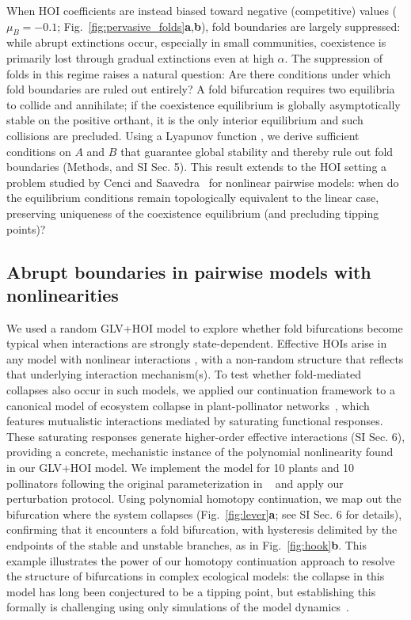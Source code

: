 \documentclass[
 reprint,
 amsmath,
 amssymb,
 aps,
 superscriptaddress,
]{revtex4-2}
\begin{document}
When HOI coefficients are instead biased toward negative (competitive) values ($\mu_B = -0.1$; Fig.~\ref{fig:pervasive_folds}\textbf{a},\textbf{b}), fold boundaries are largely suppressed: while abrupt extinctions occur, especially in small communities, coexistence is primarily lost through gradual extinctions even at high $\alpha$. The suppression of folds in this regime raises a natural question: Are there conditions under which fold boundaries are ruled out entirely? A fold bifurcation requires two equilibria to collide and annihilate; if the coexistence equilibrium is globally asymptotically stable on the positive orthant, it is the only interior equilibrium and such collisions are precluded. Using a Lyapunov function \cite{goh_global_1977, allesina_global_2026}, we derive sufficient conditions on $A$ and $B$ that guarantee global stability and thereby rule out fold boundaries (Methods, and SI Sec. 5). This result extends to the HOI setting a problem studied by Cenci and Saavedra~\cite{cenci_structural_2018} for nonlinear pairwise models: when do the equilibrium conditions remain topologically equivalent to the linear case, preserving uniqueness of the coexistence equilibrium (and precluding tipping points)?

\subsection*{Abrupt boundaries in pairwise models with nonlinearities}

We used a random GLV+HOI model to explore whether fold bifurcations become typical when interactions are strongly state-dependent. Effective HOIs arise in any model with nonlinear interactions \cite{letten_mechanistic_2019, abrams_arguments_1983, mustri_accuracy_2025}, with a non-random structure that reflects that underlying interaction mechanism(s). To test whether fold-mediated collapses also occur in such models, we applied our continuation framework to a canonical model of ecosystem collapse in plant-pollinator networks~\cite{lever_sudden_2014}, which features mutualistic interactions mediated by saturating functional responses. These saturating responses generate higher-order effective interactions (SI Sec. 6), providing a concrete, mechanistic instance of the polynomial nonlinearity found in our GLV+HOI model. We implement the model for 10 plants and 10 pollinators following the original parameterization in ~\cite{lever_sudden_2014} and apply our perturbation protocol. Using polynomial homotopy continuation, we map out the bifurcation where the system collapses (Fig.~\ref{fig:lever}\textbf{a}; see SI Sec. 6 for details), confirming that it encounters a fold bifurcation, with hysteresis delimited by the endpoints of the stable and unstable branches, as in Fig.~\ref{fig:hook}\textbf{b}. This example illustrates the power of our homotopy continuation approach to resolve the structure of bifurcations in complex ecological models: the collapse in this model has long been conjectured to be a tipping point, but establishing this formally is challenging using only simulations of the model dynamics~\cite{bascompte_resilience_2023}.
\end{document}
